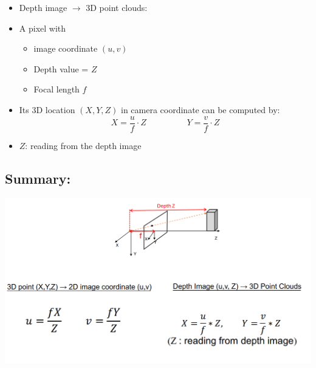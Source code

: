 \documentclass[10pt]{article}
\begin{document}
\begin{itemize}
	\item Depth image $\rightarrow$ 3D point clouds:
	\item A pixel with
	\begin{itemize}
        \item image coordinate $(u, v)$
        \item Depth value = $Z$
        \item Focal length $f$
    \end{itemize} 
    \item Its 3D location $(X, Y, Z)$ in camera coordinate can be computed by:
    \[X = \frac{u}{f} \cdot Z \hspace{2cm} Y = \frac{v}{f} \cdot Z\]
    \item $Z$: reading from the depth image
\end{itemize}

\subsection*{Summary:}
\begin{center} 
	\includegraphics*[width=\textwidth]{L1_30.png} 
\end{center}
\end{document}
